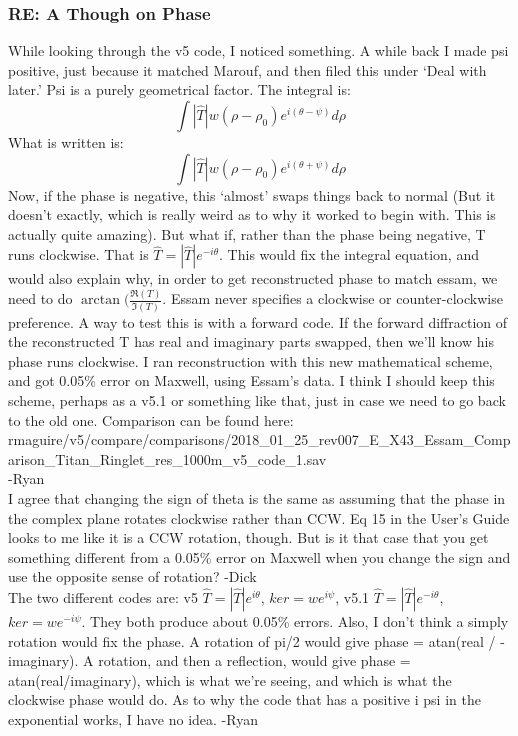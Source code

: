 \documentclass[crop=false,class=article,oneside]{standalone}
\begin{document}
\subsubsection{\footnotesize RE: A Though on Phase}
While looking through the v5 code, I noticed something. A while back I made psi positive, just because it matched Marouf, and then filed this under `Deal with later.' Psi is a purely geometrical factor. The integral is:
\begin{equation*}
    \int|\hat{T}|w(\rho-\rho_{0})e^{i(\theta-\psi)}d\rho
\end{equation*}
What is written is:
\begin{equation*}
    \int|\hat{T}|w(\rho-\rho_{0})e^{i(\theta+\psi)}d\rho
\end{equation*}
Now, if the phase is negative, this `almost' swaps things back to normal (But it doesn’t exactly, which is really weird as to why it worked to begin with. This is actually quite amazing). But what if, rather than the phase being negative, T runs clockwise. That is $\hat{T}=|\hat{T}|e^{-i\theta}$. This would fix the integral equation, and would also explain why, in order to get reconstructed phase to match essam, we need to do $\arctan(\frac{\Re(T)}{\Im(T)}$. Essam never specifies a clockwise or counter-clockwise preference. A way to test this is with a forward code. If the forward diffraction of the reconstructed T has real and imaginary parts swapped, then we'll know his phase runs clockwise. I ran reconstruction with this new mathematical scheme, and got 0.05\% error on Maxwell, using Essam's data. I think I should keep this scheme, perhaps as a v5.1 or something like that, just in case we need to go back to the old one. Comparison can be found here:\\
rmaguire/v5/compare/comparisons/2018\_01\_25\_rev007\_E\_X43\_Essam\_Comparison\_Titan\_Ringlet\_res\_1000m\_v5\_code\_1.sav\\
-Ryan\\
I agree that changing the sign of theta is the same as assuming that the phase in the complex plane rotates clockwise rather than CCW. Eq 15 in the User's Guide looks to me like it is a CCW rotation, though. But is it that case that you get something different from a 0.05\% error on Maxwell when you change the sign and use the opposite sense of rotation? -Dick\\
The two different codes are: v5 $\hat{T}=|\hat{T}|e^{i\theta}$, $ker=we^{i\psi}$, v5.1 $\hat{T}=|\hat{T}|e^{-i\theta}$, $ker=we^{-i\psi}$. They both produce about 0.05\% errors. Also, I don't think a simply rotation would fix the phase. A rotation of pi/2 would give phase = atan(real / -imaginary). A rotation, and then a reflection, would give phase = atan(real/imaginary), which is what we're seeing, and which is what the clockwise phase would do. As to why the code that has a positive i psi in the exponential works, I have no idea. -Ryan
\end{document}
